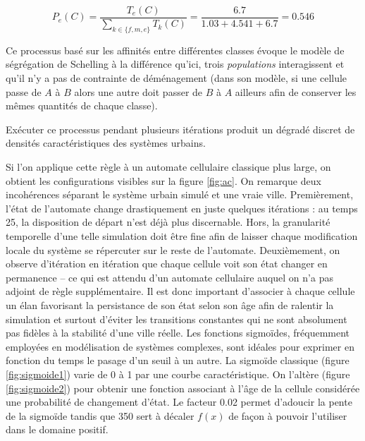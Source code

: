 \documentclass[10pt]{article}
\begin{document}
\begin{equation*}
P_e(C) = \frac{T_e(C)}{\sum_{k \in \{f,m,e\}} T_k(C)} = \frac{6.7}{1.03 + 4.541 + 6.7} = 0.546
\end{equation*}

Ce processus basé sur les affinités entre différentes classes évoque
le modèle de ségrégation de Schelling à la différence qu'ici, trois
\textit{populations} interagissent et qu'il n'y a pas de contrainte de
déménagement (dans son modèle, si une cellule passe de $A$ à $B$ alors
une autre doit passer de $B$ à $A$ ailleurs afin de conserver les
mêmes quantités de chaque classe).

Exécuter ce processus pendant plusieurs itérations produit un dégradé
discret de densités caractéristiques des systèmes urbains.

Si l'on applique cette règle à un automate cellulaire classique plus
large, on obtient les configurations visibles sur la figure
\ref{fig:ac}. On remarque deux incohérences séparant le système urbain
simulé et une vraie ville. Premièrement, l'état de l'automate change
drastiquement en juste quelques itérations : au temps 25, la
disposition de départ n'est déjà plus discernable. Hors, la
granularité temporelle d'une telle simulation doit être fine afin de
laisser chaque modification locale du système se répercuter sur le
reste de l'automate. Deuxièmement, on observe d'itération en itération
que chaque cellule voit son état changer en permanence -- ce qui est
attendu d'un automate cellulaire auquel on n'a pas adjoint de règle
supplémentaire. Il est donc important d'associer à chaque cellule un
élan favorisant la persistance de son état selon son âge afin de
ralentir la simulation et surtout d'éviter les transitions constantes
qui ne sont absolument pas fidèles à la stabilité d'une ville
réelle. Les fonctions sigmoïdes, fréquemment employées en modélisation
de systèmes complexes, sont idéales pour exprimer en fonction du temps
le pasage d'un seuil à un autre. La sigmoïde classique (figure
\ref{fig:sigmoide1}) varie de 0 à 1 par une courbe caractéristique. On
l'altère (figure \ref{fig:sigmoide2}) pour obtenir une fonction
associant à l'âge de la cellule considérée une probabilité de
changement d'état. Le facteur 0.02 permet d'adoucir la pente de la
sigmoïde tandis que 350 sert à décaler $f(x)$ de façon à pouvoir
l'utiliser dans le domaine positif.
\end{document}
